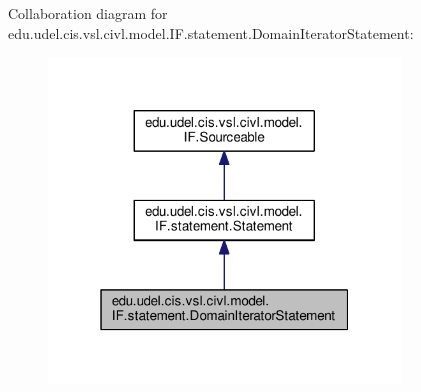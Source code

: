 Collaboration diagram for edu.\+udel.\+cis.\+vsl.\+civl.\+model.\+I\+F.\+statement.\+Domain\+Iterator\+Statement\+:
\nopagebreak
\begin{figure}[H]
\begin{center}
\leavevmode
\includegraphics[width=265pt]{interfaceedu_1_1udel_1_1cis_1_1vsl_1_1civl_1_1model_1_1IF_1_1statement_1_1DomainIteratorStatement__coll__graph}
\end{center}
\end{figure}
